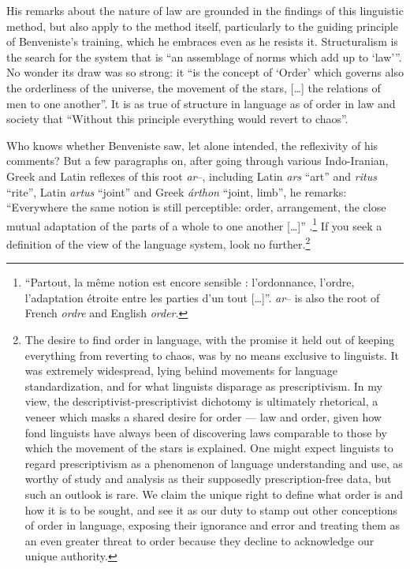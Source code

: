 \documentclass[output=paper]{langscibook}
\begin{document}
His remarks about the nature of law are grounded in the findings of this linguistic method, but also apply to the method itself, particularly to the guiding principle of Benveniste's training, which he embraces even as he resists it. Structuralism is the search for the system that is ``an assemblage of norms which add up to `law'\thinspace''. No wonder its draw was so strong: it ``is the concept of `Order' which governs also the orderliness of the universe, the movement of the stars, […] the relations of men to one another''. It is as true of structure in language as of order in law and society that ``Without this principle everything would revert to chaos''.

Who knows whether Benveniste saw, let alone intended, the reflexivity of his comments? But a few paragraphs on, after going through various Indo-Iranian, Greek and Latin reflexes of this root \emph{ar}--, including Latin \emph{ars} ``art'' and \emph{ritus} ``rite'', Latin \emph{artus} ``joint'' and Greek \emph{árthon} ``joint, limb'', he remarks: ``Everywhere the same notion is still perceptible: order, arrangement, the close mutual adaptation of the parts of a whole to one another […]'' \citep[101]{Benveniste1969vocabulaire}.\footnote{``Partout, la même notion est encore sensible : l'ordonnance, l'ordre, l'adaptation étroite entre les parties d'un tout […]''. \emph{ar}-- is also the root of French \emph{ordre} and English \emph{order}.} If you seek a definition of the  view of the language system, look no further.\footnote{The desire to find order in language, with the promise it held out of keeping everything from reverting to chaos, was by no means exclusive to linguists. It was extremely widespread, lying behind movements for language standardization, and for what linguists disparage as prescriptivism. In my view, the descriptivist-prescriptivist dichotomy is ultimately rhetorical, a veneer which masks a shared desire for order — law and order, given how fond linguists have always been of discovering laws comparable to those by which the movement of the stars is explained. One might expect linguists to regard prescriptivism as a phenomenon of language understanding and use, as worthy of study and analysis as their supposedly prescription-free data, but such an outlook is rare. We claim the unique right to define what order is and how it is to be sought, and see it as our duty to stamp out other conceptions of order in language, exposing their ignorance and error and treating them as an even greater threat to order because they decline to acknowledge our unique authority.}
\end{document}
